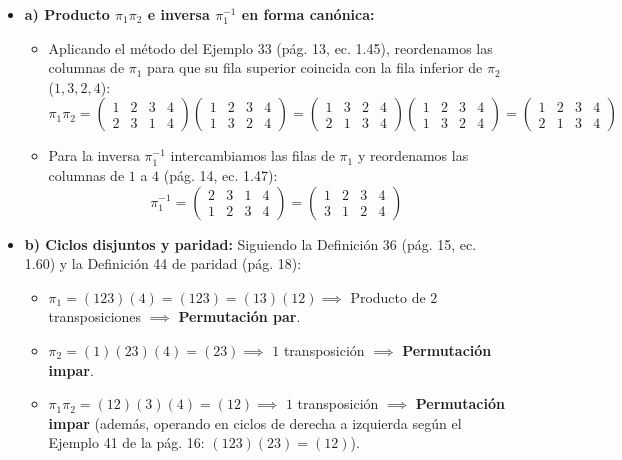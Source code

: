 \documentclass[11pt, a4paper]{article}
\begin{document}
\begin{itemize}
    \item \textbf{a) Producto $\pi_1 \pi_2$ e inversa $\pi_1^{-1}$ en forma canónica:}
    \begin{itemize}
        \item Aplicando el método del Ejemplo 33 (pág. 13, ec. 1.45), reordenamos las columnas de $\pi_1$ para que su fila superior coincida con la fila inferior de $\pi_2$ ($1, 3, 2, 4$):
        \[
        \pi_1 \pi_2 = \begin{pmatrix} 1 & 2 & 3 & 4 \\ 2 & 3 & 1 & 4 \end{pmatrix} \begin{pmatrix} 1 & 2 & 3 & 4 \\ 1 & 3 & 2 & 4 \end{pmatrix} = \begin{pmatrix} 1 & 3 & 2 & 4 \\ 2 & 1 & 3 & 4 \end{pmatrix} \begin{pmatrix} 1 & 2 & 3 & 4 \\ 1 & 3 & 2 & 4 \end{pmatrix} = \begin{pmatrix} 1 & 2 & 3 & 4 \\ 2 & 1 & 3 & 4 \end{pmatrix}
        \]
        \item Para la inversa $\pi_1^{-1}$ intercambiamos las filas de $\pi_1$ y reordenamos las columnas de $1$ a $4$ (pág. 14, ec. 1.47):
        \[
        \pi_1^{-1} = \begin{pmatrix} 2 & 3 & 1 & 4 \\ 1 & 2 & 3 & 4 \end{pmatrix} = \begin{pmatrix} 1 & 2 & 3 & 4 \\ 3 & 1 & 2 & 4 \end{pmatrix}
        \]
    \end{itemize}

    \item \textbf{b) Ciclos disjuntos y paridad:}
    Siguiendo la Definición 36 (pág. 15, ec. 1.60) y la Definición 44 de paridad (pág. 18):
    \begin{itemize}
        \item $\pi_1 = (123)(4) = (123) = (13)(12) \implies$ Producto de $2$ transposiciones $\implies$ \textbf{Permutación par}.
        \item $\pi_2 = (1)(23)(4) = (23) \implies$ $1$ transposición $\implies$ \textbf{Permutación impar}.
        \item $\pi_1 \pi_2 = (12)(3)(4) = (12) \implies$ $1$ transposición $\implies$ \textbf{Permutación impar} (además, operando en ciclos de derecha a izquierda según el Ejemplo 41 de la pág. 16: $(123)(23) = (12)$).
    \end{itemize}


\end{itemize}
\end{document}
